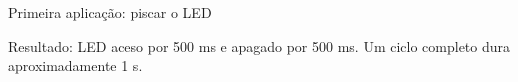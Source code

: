 \begin{frame}[fragile,t]{Primeira aplicação: piscar o LED}

\small Resultado: LED aceso por 500 ms e apagado por 500 ms. Um ciclo completo dura aproximadamente 1 s.
\end{frame}
